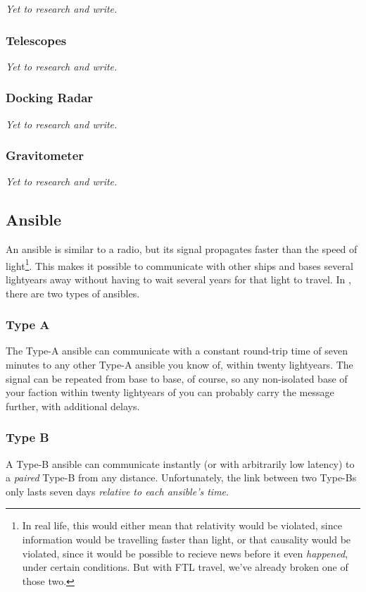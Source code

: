 \textit{Yet to research and write.}

\subsubsection{Telescopes}

\textit{Yet to research and write.}

\subsubsection{Docking Radar}

\textit{Yet to research and write.}

\subsubsection{Gravitometer}

\textit{Yet to research and write.}

\subsection{Ansible}
\par
An ansible is similar to a radio, but its signal propagates faster than the speed of light\footnote{In real life, this would either mean that relativity would be violated, since information would be travelling faster than light, or that causality would be violated, since it would be possible to recieve news before it even \textit{happened}, under certain conditions. But with FTL travel, we've already broken one of those two.}. This makes it possible to communicate with other ships and bases several lightyears away without having to wait several years for that light to travel. In \getTitle, there are two types of ansibles.

\subsubsection{Type A}
\par
The Type-A ansible can communicate with a constant round-trip time of seven minutes to any other Type-A ansible you know of, within twenty lightyears. The signal can be repeated from base to base, of course, so any non-isolated base of your faction within twenty lightyears of you can probably carry the message further, with additional delays.

\subsubsection{Type B}
\par
A Type-B ansible can communicate instantly (or with arbitrarily low latency) to a \textit{paired} Type-B from any distance. Unfortunately, the link between two Type-Bs only lasts seven days \textit{relative to each ansible's time}.

